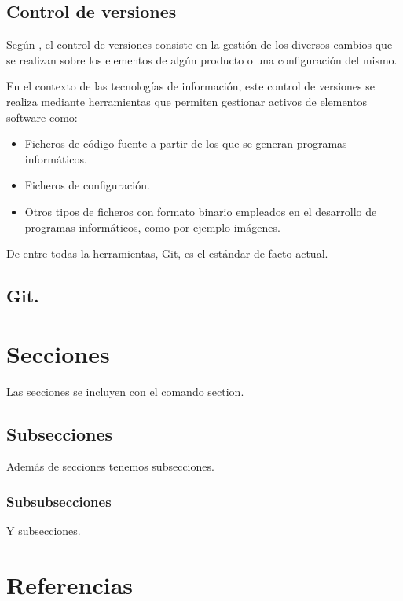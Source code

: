 \subsection{Control de versiones}

Según \cite{wiki:control-versiones}, el control de versiones consiste en la  gestión de los diversos cambios que se realizan sobre los elementos de algún producto o una configuración del mismo.

En el contexto de las tecnologías de información, este control de versiones se realiza mediante herramientas que permiten gestionar activos de elementos software como:

\begin{itemize}
	\item Ficheros de código fuente a partir de los que se generan programas informáticos.
	\item Ficheros de configuración.
	\item Otros tipos de ficheros con formato binario empleados en el desarrollo de programas informáticos, como por ejemplo imágenes.
\end{itemize}

De entre todas la herramientas, Git, es el estándar de facto actual.

\subsection{Git.}



\section{Secciones}

Las secciones se incluyen con el comando section.

\subsection{Subsecciones}

Además de secciones tenemos subsecciones.

\subsubsection{Subsubsecciones}

Y subsecciones. 


\section{Referencias}

